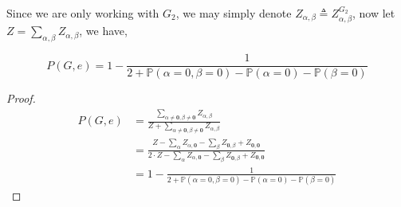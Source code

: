 Since we are only working with $G_2$, we may simply denote $Z_{\alpha, \beta} \triangleq Z_{\alpha, \beta}^{G_2}$, now let $Z = \sum_{\alpha , \beta} Z_{\alpha, \beta}$, we have,

\begin{Prop}
	
\[P(G,e) =  1 - \frac{1}{2 + \mathbb{P}\left( \alpha = 0, \beta = 0 \right) - \mathbb{P} \left( \alpha = 0 \right) - \mathbb{P} \left( \beta = 0 \right)}\]
\end{Prop}
\begin{proof}
	\begin{align*}
P(G,e) &= \frac{\sum_{\alpha \neq \mathbf{0}, \beta \neq \mathbf{0}} Z_{\alpha, \beta}}{Z + \sum_{\alpha \neq \mathbf{0}, \beta \neq \mathbf{0}} Z_{\alpha, \beta}} \\
&=\frac{Z - \sum_{\alpha}Z_{\alpha,\mathbf{0}} - \sum_{\beta} Z_{\mathbf{0}, \beta} + Z_{\mathbf{0}, \mathbf{0}}}{2\cdot Z - \sum_{\alpha}Z_{\alpha,\mathbf{0}} - \sum_{\beta} Z_{\mathbf{0}, \beta} + Z_{\mathbf{0}, \mathbf{0}}} \\
&= 1 - \frac{1}{2 + \mathbb{P}\left( \alpha = 0, \beta = 0 \right) - \mathbb{P} \left( \alpha = 0 \right) - \mathbb{P} \left( \beta = 0 \right)}
	\end{align*}
\end{proof}


